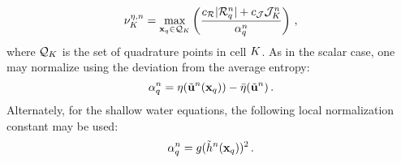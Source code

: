 \begin{equation}
   \entropycellviscosity[n]
     = \max\limits_{\x_q\in \mathcal{Q}_\cell}\pr{\frac{\entropyresidualcoef
     |\entropyresidual_q^\timeindex|
     + \entropyjumpcoef\entropyjump_\cell^\timeindex}
     {\entropynormalization^\timeindex_q}}
   \eqc
\end{equation}
where $\mathcal{Q}_K$ is the set of quadrature points in cell $K$.
As in the scalar case, one may normalize using the deviation from the average
entropy:
\begin{equation}
  \alpha^n_q
    = \eta(\tilde{\mathbf{u}}^n(\mathbf{x}_q))
   -\bar{\eta}(\tilde{\mathbf{u}}^n)
  \,.
\end{equation}
Alternately, for the shallow water equations, the following local normalization
constant may be used:
\begin{equation}
  \alpha^n_q
  = g (\tilde{h}^n(\mathbf{x}_q))^2
  \,.
\end{equation}

